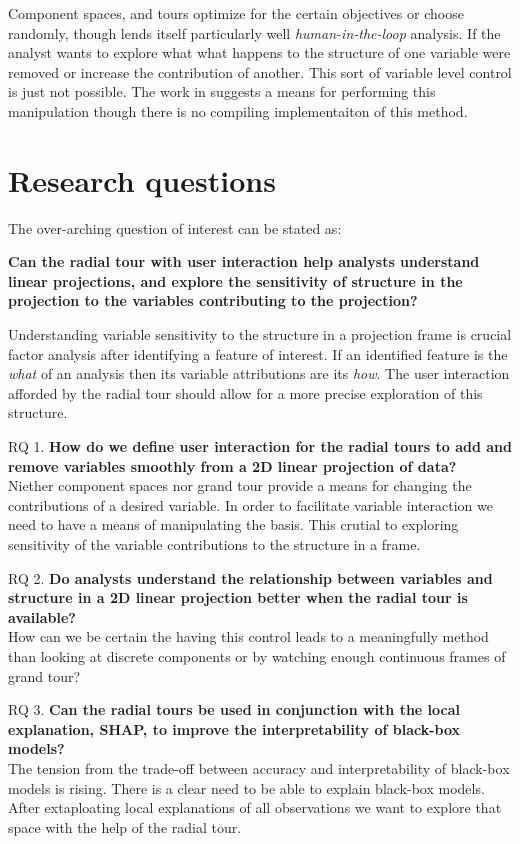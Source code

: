 \documentclass{template/monashthesis}
\begin{document}
Component spaces, and tours optimize for the certain objectives or choose randomly, though lends itself particularly well \emph{human-in-the-loop} \autocite{karwowski_international_2006} analysis. If the analyst wants to explore what what happens to the structure of one variable were removed or increase the contribution of another. This sort of variable level control is just not possible. The work in \textcite{cook_manual_1997} suggests a means for performing this manipulation though there is no compiling implementaiton of this method.

\hypertarget{research-questions}{%
\section{Research questions}\label{research-questions}}

The over-arching question of interest can be stated as:

\textbf{Can the radial tour with user interaction help analysts understand linear projections, and explore the sensitivity of structure in the projection to the variables contributing to the projection?}

Understanding variable sensitivity to the structure in a projection frame is crucial factor analysis after identifying a feature of interest. If an identified feature is the \emph{what} of an analysis then its variable attributions are its \emph{how}. The user interaction afforded by the radial tour should allow for a more precise exploration of this structure.

RQ 1. \textbf{How do we define user interaction for the radial tours to add and remove variables smoothly from a 2D linear projection of data?}\\
Niether component spaces nor grand tour provide a means for changing the contributions of a desired variable. In order to facilitate variable interaction we need to have a means of manipulating the basis. This crutial to exploring sensitivity of the variable contributions to the structure in a frame.

RQ 2. \textbf{Do analysts understand the relationship between variables and structure in a 2D linear projection better when the radial tour is available?}\\
How can we be certain the having this control leads to a meaningfully method than looking at discrete components or by watching enough continuous frames of grand tour?

RQ 3. \textbf{Can the radial tours be used in conjunction with the local explanation, SHAP, to improve the interpretability of black-box models?}\\
The tension from the trade-off between accuracy and interpretability of black-box models is rising. There is a clear need to be able to explain black-box models. After extaploating local explanations of all observations we want to explore that space with the help of the radial tour.
\end{document}
